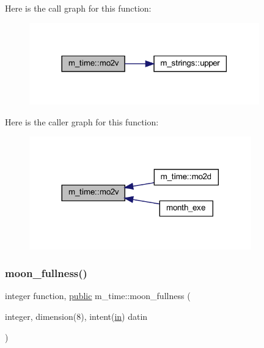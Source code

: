 \begin{DoxyVerb}
Here is the call graph for this function\+:
\nopagebreak
\begin{figure}[H]
\begin{center}
\leavevmode
\includegraphics[width=282pt]{namespacem__time_ad7bf0886754757e8961e562f06cf3bb7_cgraph}
\end{center}
\end{figure}
Here is the caller graph for this function\+:
\nopagebreak
\begin{figure}[H]
\begin{center}
\leavevmode
\includegraphics[width=272pt]{namespacem__time_ad7bf0886754757e8961e562f06cf3bb7_icgraph}
\end{center}
\end{figure}
\mbox{\label{namespacem__time_a702b39998a769b8f60070c0bec975ee2}} 
\subsubsection{\texorpdfstring{moon\+\_\+fullness()}{moon\_fullness()}}
{\footnotesize\ttfamily integer function, \hyperlink{M__stopwatch_83_8txt_a2f74811300c361e53b430611a7d1769f}{public} m\+\_\+time\+::moon\+\_\+fullness (\begin{DoxyParamCaption}\item[{integer, dimension(8), intent(\hyperlink{M__journal_83_8txt_afce72651d1eed785a2132bee863b2f38}{in})}]{datin }\end{DoxyParamCaption})}




\end{DoxyVerb}
